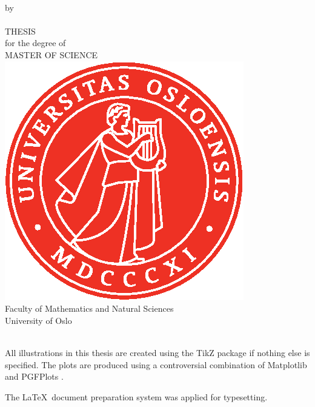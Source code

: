 \thispagestyle{empty}
\begin{center} \vspace{1cm}
    \textbf{\Large{\mtitle}}\\ \vspace{0.5cm}
    \small{by}\\ \vspace{0.5cm}
    \large{\mauthor}\\ \vspace{4.4cm}
    \large{THESIS}\\ \vspace{0.3cm}
    \small{for the degree of}\\ \vspace{0.3cm}
    \large{MASTER OF SCIENCE}\\ \vspace{0.7cm}
    \includegraphics[scale=1.0]{../Images/UiO_Segl_pms485.eps} \\ \vspace{0.5cm}
    \large{Faculty of Mathematics and Natural Sciences \\ University of Oslo} \\ \vspace{0.5cm}
    \small{\mdate}\\ \vfill
\end{center}
\newpage
\vspace*{\fill}
{\setlength{\parindent}{0cm}
All illustrations in this thesis are created using the TikZ package \supercite{tantau_graph_2013} if nothing else is specified. The plots are produced using a controversial combination of Matplotlib \supercite{hunter_matplotlib:_2007} and PGFPlots \supercite{tantau_graph_2013}.\bigskip

The \LaTeX\, document preparation system was applied for typesetting.}
 
